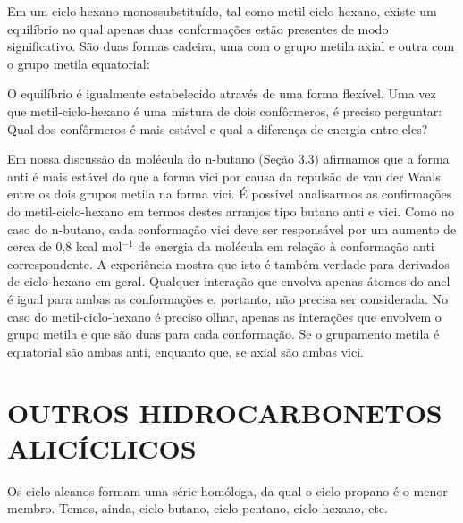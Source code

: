 Em um ciclo-hexano monossubstituído, tal como metil-ciclo-hexano, existe um equilíbrio no qual apenas duas conformações estão presentes de modo significativo. São duas formas cadeira, uma com o grupo metila axial e outra com o grupo metila equatorial: 

\noindent O equilíbrio é igualmente estabelecido através de uma forma flexível. Uma vez que metil-ciclo-hexano é uma mistura de dois confôrmeros, é preciso perguntar: Qual dos confôrmeros é mais estável e qual a diferença de energia entre eles?

Em nossa discussão da molécula do n-butano (Seção 3.3) afirmamos que a forma anti é mais estável do que a forma vici por causa da repulsão de van der Waals entre os dois grupos metila na forma vici. É possível analisarmos as confirmações do metil-ciclo-hexano em termos destes arranjos tipo butano anti e vici. Como no caso do n-butano, cada conformação vici deve ser responsável por um aumento de cerca de 0,8 kcal mol$^{-1}$ de energia da molécula em relação à conformação anti correspondente. A experiência mostra que isto é também verdade para derivados de ciclo-hexano em geral. Qualquer interação que envolva apenas átomos do anel é igual para ambas as conformações e, portanto, não precisa ser considerada. No caso do metil-ciclo-hexano é preciso olhar, apenas as interações que envolvem o grupo metila e que são duas para cada conformação. Se o grupamento metila é equatorial são ambas anti, enquanto que, se axial são ambas vici.

\section{OUTROS HIDROCARBONETOS ALICÍCLICOS}

Os ciclo-alcanos formam uma série homóloga, da qual o ciclo-propano é o menor membro. Temos, ainda, ciclo-butano, ciclo-pentano, ciclo-hexano, etc.

\begin{figure}[H]
    \centering
    \quad\quad\quad\quad
    \quad\quad\quad\quad
    \quad\quad\quad\quad
    \chemnameinit{}
\end{figure}

